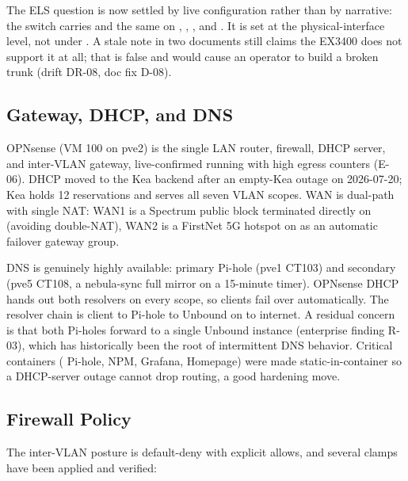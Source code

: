 The ELS  question is now settled by live configuration rather than
by narrative: the switch carries  and the
same on , , ,  and
. It is set at the physical-interface
level, not under . A stale note in two documents
still claims the EX3400 does not support it at all; that is false and would cause an
operator to build a broken trunk (drift DR-08, doc fix D-08).

\subsection{Gateway, DHCP, and DNS}

OPNsense (VM 100 on pve2) is the single LAN router, firewall, DHCP server, and
inter-VLAN gateway, live-confirmed running with high egress counters (E-06). DHCP moved
to the Kea backend after an empty-Kea outage on 2026-07-20; Kea holds 12 reservations
and serves all seven VLAN scopes. WAN is dual-path with single NAT: WAN1 is a Spectrum
public block terminated directly on  (avoiding double-NAT), WAN2 is a
FirstNet 5G hotspot on  as an automatic failover gateway group.

DNS is genuinely highly available: primary Pi-hole  (pve1 CT103) and
secondary  (pve5 CT108, a nebula-sync full mirror on a 15-minute timer).
OPNsense DHCP hands out both resolvers on every scope, so clients fail over
automatically. The resolver chain is client to Pi-hole to Unbound on  to
internet. A residual concern is that both Pi-holes forward to a single Unbound instance
(enterprise finding R-03), which has historically been the root of intermittent DNS
behavior. Critical containers ( Pi-hole,  NPM, 
Grafana,  Homepage) were made static-in-container so a DHCP-server outage
cannot drop routing, a good hardening move.

\subsection{Firewall Policy}

The inter-VLAN posture is default-deny with explicit allows, and several clamps have
been applied and verified:

